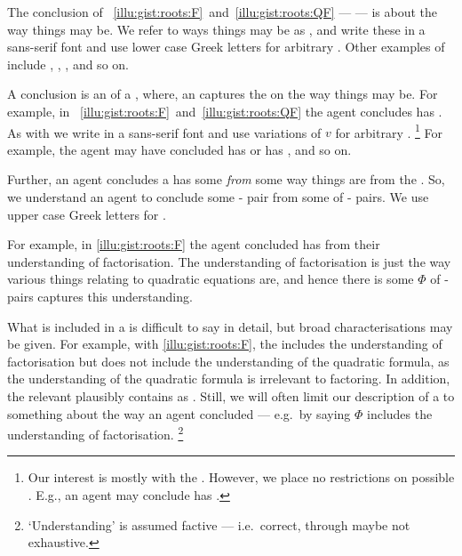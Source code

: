 \begin{note}
  The conclusion of ~\ref{illu:gist:roots:F}~and~\ref{illu:gist:roots:QF} --- \propM{\rootsCon{}} --- is about the way things may be.
  We refer to ways things may be as \emph{}, and write these in a \textsf{sans-serif} font and use lower case Greek letters for arbitrary .
  Other examples of  include , , , and so on.

  A conclusion is an \eval{} of a , where, an \eval{} captures the \agpe{} on the way things may be.
  For example, in ~\ref{illu:gist:roots:F}~and~\ref{illu:gist:roots:QF} the agent concludes \propM{\rootsCon{}} has \emph{} .
  As with  we write  in a \textsf{sans-serif} font and use variations of \(v\) for arbitrary .%
  \footnote{
    Our interest is mostly with the \val{} .
    However, we place no restrictions on possible .
    E.g., an agent may conclude  has \val{} .
  }
  For example, the agent may have concluded \propM{\rootsCon{}} has \val{}  or \propM{\rootsConBad{}} has \val{} , and so on.
\end{note}


\begin{note}
  Further, an agent concludes a  has some  \emph{from} some way things are from the \agpe{}.
  So, we understand an agent to conclude some - pair from some \emph{\pool{}} of \prop{}-\val{} pairs.
  We use upper case Greek letters for .

  For example, in \autoref{illu:gist:roots:F} the agent concluded \propM{\rootsCon{}} has  from their understanding of factorisation.
  The \agents{} understanding of factorisation is just the way various things relating to quadratic equations are, and hence there is some \pool{} \(\Phi\) of - pairs captures this understanding.

  What is included in a \pool{} is difficult to say in detail, but broad characterisations may be given.
  For example, with \autoref{illu:gist:roots:F}, the \pool{} includes the \agents{} understanding of factorisation but does not include the \agents{} understanding of the quadratic formula, as the \agents{} understanding of the quadratic formula is irrelevant to factoring.
  In addition, the relevant \pool{} plausibly contains \rootsConEq{} \evaled{} as .
  Still, we will often limit our description of a \pool{} to something about the way an agent concluded --- e.g.\ by saying \(\Phi\) includes the \agents{} understanding of factorisation.%
  \footnote{
    `Understanding' is assumed factive --- i.e.\ correct, through maybe not exhaustive.
  }
\end{note}



